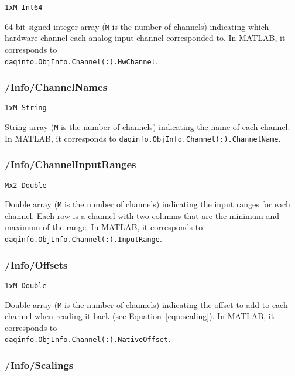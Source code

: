 \documentclass[12pt]{article} %
\begin{document}
\verb|1xM Int64|

64-bit signed integer array (\verb|M| is the number of channels) indicating which hardware channel each analog input channel corresponded to.
In MATLAB\textsuperscript{\textregistered}, it corresponds to \\ \verb|daqinfo.ObjInfo.Channel(:).HwChannel|.



\subsubsection{/Info/ChannelNames}

\verb|1xM String|

String array (\verb|M| is the number of channels) indicating the name of each channel.
In MATLAB\textsuperscript{\textregistered}, it corresponds to \verb|daqinfo.ObjInfo.Channel(:).ChannelName|.



\subsubsection{/Info/ChannelInputRanges}

\verb|Mx2 Double|

Double array (\verb|M| is the number of channels) indicating the input ranges for each channel.
Each row is a channel with two columns that are the minimum and maximum of the range.
In MATLAB\textsuperscript{\textregistered}, it corresponds to \verb|daqinfo.ObjInfo.Channel(:).InputRange|.



\subsubsection{/Info/Offsets} \label{sec:info_offsets}

\verb|1xM Double|

Double array (\verb|M| is the number of channels) indicating the offset to add to each channel when reading it back (see Equation~\ref{eqn:scaling}).
In MATLAB\textsuperscript{\textregistered}, it corresponds to \\ \verb|daqinfo.ObjInfo.Channel(:).NativeOffset|.



\subsubsection{/Info/Scalings} \label{sec:info_scalings}
\end{document}
